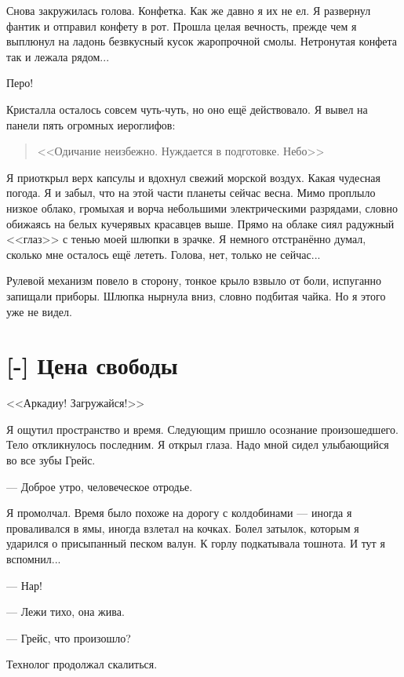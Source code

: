 Снова закружилась голова.
Конфетка.
Как же давно я их не ел.
Я развернул фантик и отправил конфету в рот.
Прошла целая вечность, прежде чем я выплюнул на ладонь безвкусный кусок жаропрочной смолы.
Нетронутая конфета так и лежала рядом...

Перо!

Кристалла осталось совсем чуть-чуть, но оно ещё действовало.
Я вывел на панели пять огромных иероглифов:

\begin{quote}
<<Одичание неизбежно.
Нуждается в подготовке.
Небо>>
\end{quote}

Я приоткрыл верх капсулы и вдохнул свежий морской воздух.
Какая чудесная погода.
Я и забыл, что на этой части планеты сейчас весна.
Мимо проплыло низкое облако, громыхая и ворча небольшими электрическими разрядами, словно обижаясь на белых кучерявых красавцев выше.
Прямо на облаке сиял радужный <<глаз>> с тенью моей шлюпки в зрачке.
Я немного отстранённо думал, сколько мне осталось ещё лететь.
Голова, нет, только не сейчас...

Рулевой механизм повело в сторону, тонкое крыло взвыло от боли, испуганно запищали приборы.
Шлюпка нырнула вниз, словно подбитая чайка.
Но я этого уже не видел.

\section{[-] Цена свободы}

<<Аркадиу!
Загружайся!>>

Я ощутил пространство и время.
Следующим пришло осознание произошедшего.
Тело откликнулось последним.
Я открыл глаза.
Надо мной сидел улыбающийся во все зубы Грейс.

--- Доброе утро, человеческое отродье.

Я промолчал.
Время было похоже на дорогу с колдобинами --- иногда я проваливался в ямы, иногда взлетал на кочках.
Болел затылок, которым я ударился о присыпанный песком валун.
К горлу подкатывала тошнота.
И тут я вспомнил...

--- Нар!

--- Лежи тихо, она жива.

--- Грейс, что произошло?

Технолог продолжал скалиться.

